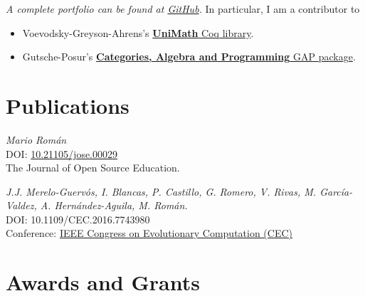 \documentclass[nocolors]{friggeri-cv-a4}
\begin{document}
\textit{A complete portfolio can be found at
  \href{https://github.com/mroman42}{GitHub}.}
In particular, I am a contributor to
\begin{itemize}
\item Voevodsky-Greyson-Ahrens's \href{https://github.com/UniMath/UniMath}{\textbf{UniMath} Coq library}.
\item Gutsche-Posur's \href{https://homalg-project.github.io/CAP_project/CAP/}{\textbf{Categories, Algebra and Programming} GAP package}.
\end{itemize}

 
 \section{Publications}

 \begin{entrylist}
   {
     \textit{Mario Román} \\
     DOI: \href{https://jose.theoj.org/papers/10.21105/jose.00029}{10.21105/jose.00029} \\
     The Journal of Open Source Education.
   }
   
   {
     \textit{J.J. Merelo-Guervós, I. Blancas, P. Castillo, G. Romero, V. Rivas, M. García-Valdez, A. Hernández-Aguila, M. Román.} \\
     DOI: 10.1109/CEC.2016.7743980 \\
     Conference: \href{http://ieeexplore.ieee.org/document/7743980/2016}{IEEE Congress on Evolutionary Computation (CEC)}
     }
 \end{entrylist}

\section{Awards and Grants}
\end{document}
